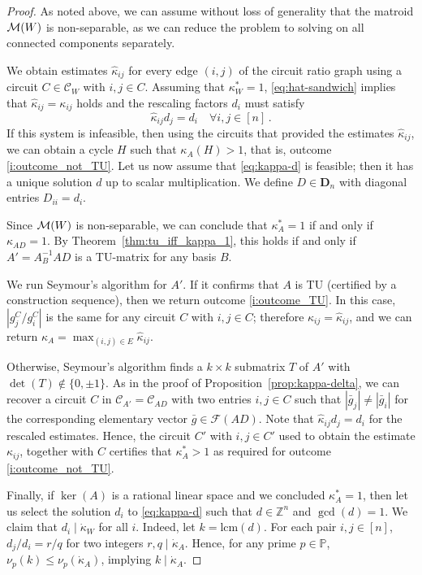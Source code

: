 \documentclass[11pt, a4paper]{article}
\newcommand{\Le}{\kappa}
\newcommand{\circuits}{\mathcal{C}}
\newcommand{\1}{\mathbbm{1}}
\newcommand{\kd}{{\dot{\kappa}}}
\newcommand{\primes}{\mathbb{P}}
\newcommand{\divides}{\mid}
\newcommand{\EE}{\mathcal F}
\newcommand{\bD}{\mathbf{D}}
\newcommand{\lcm}{\mathrm{lcm}}
\theoremstyle{case}
\newcommand{\Z}{\mathbb{Z}}
\begin{document}
\begin{proof}
As noted above, we can assume without loss of generality that the matroid ${\cal M}(W)$ is non-separable, as we can reduce the problem to solving on all connected components separately.

We obtain estimates $\hat\Le_{ij}$ for every edge $(i,j)$ of the circuit ratio graph  using a circuit $C\in\circuits_W$ with $i,j\in C$. Assuming that $\Le^*_W=1$, \eqref{eq:hat-sandwich} implies that $\hat\kappa_{ij}=\kappa_{ij}$ holds and the rescaling factors $d_i$ must satisfy 
\begin{equation}\label{eq:kappa-d}
\hat\kappa_{ij}d_j=d_i\quad \forall i,j\in [n]\, . 
\end{equation}
If this system is infeasible, then using the circuits that provided the estimates $\hat\kappa_{ij}$, we can 
obtain a cycle  $H$ such that $\kappa_A(H)>1$, that is, outcome \ref{i:outcome_not_TU}. Let us now assume that \eqref{eq:kappa-d} is feasible; then it has a unique solution $d$ up to scalar multiplication.
We define $D\in\bD_n$ with diagonal entries $D_{ii}=d_i$. 

Since ${\cal M}(W)$ is non-separable, we can conclude that $\kappa^*_A=1$ if and only if $\kappa_{AD}=1$. By Theorem~\ref{thm:tu_iff_kappa_1}, this holds if and only if $A'=A_B^{-1} AD$ is a TU-matrix for any basis $B$.

We run Seymour's algorithm \cite{Seymour1980} for $A'$. If it confirms that $A$ is TU (certified by a construction sequence), then we return outcome \ref{i:outcome_TU}. In this case, $|g^C_j/g^C_i|$ is the same for any circuit $C$ with $i,j\in C$; therefore $\Le_{ij}=\hat\Le_{ij}$, and we can return $\Le_A=\max_{(i,j)\in E}\hat\Le_{ij}$.

Otherwise, Seymour's algorithm finds a $k\times k$ submatrix $T$ of $A'$ with $\det(T)\notin\{0,\pm1\}$. As in the proof of Proposition~\ref{prop:kappa-delta}, we can recover a circuit $C$ in $\circuits_{A'}=\circuits_{AD}$ with two entries $i,j\in C$ such that $|\bar g_j|\neq |\bar g_i|$ for the corresponding elementary vector $\bar g\in {\EE}(AD)$. Note that $\hat \Le_{ij} d_j=d_i$ for the rescaled estimates. Hence, the circuit $C'$ with $i,j\in C'$ used to obtain the estimate $\Le_{ij}$, together with $C$ certifies that $\Le^*_A>1$ as required for outcome \ref{i:outcome_not_TU}.

Finally, if $\ker(A)$ is a rational linear space and we concluded $\Le^*_A=1$, then let us select the solution $d_i$ to \eqref{eq:kappa-d} such that $d\in \Z^n$ and $\gcd(d)=1$. We claim that $d_i\divides\dot\kappa_W$ for all $i$. Indeed, let $k=\lcm(d)$. For each pair $i,j\in [n]$, $d_j/d_i = r/q$ for two integers $r,q\divides \kd_A$.
Hence, for any prime $p\in\primes$, $\nu_p(k)\le \nu_p(\kd_A)$, implying $k\divides\kd_A$. 
\end{proof}
\end{document}
